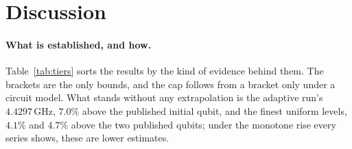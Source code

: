 \documentclass{anvil-paper}
\begin{document}
\section{Discussion}
\label{sec:discussion}

\paragraph{What is established, and how.}
Table~\ref{tab:tiers} sorts the results by the kind of evidence behind
them. The brackets are the only bounds, and the cap follows from a bracket
only under a circuit model. What stands without any extrapolation is the adaptive run's $4.4297$\,GHz, $7.0\%$ above the
published initial qubit, and the finest uniform levels, $4.1\%$ and $4.7\%$
above the two published qubits; under the monotone rise every series shows,
these are lower estimates.
\end{document}
